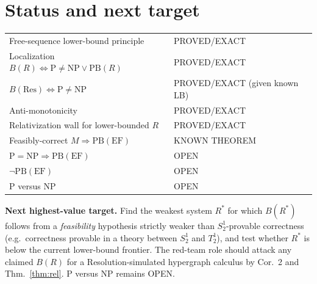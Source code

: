 \documentclass[11pt]{article}
\theoremstyle{definition}
\theoremstyle{remark}
\newcommand{\PB}{\mathrm{PB}}
\begin{document}
\section{Status and next target}
\begin{tabular}{ll}
Free-sequence lower-bound principle & PROVED/EXACT\\
Localization $B(R)\iff \mathrm P\ne\mathrm{NP}\vee\PB(R)$ & PROVED/EXACT\\
$B(\mathrm{Res})\iff\mathrm P\ne\mathrm{NP}$ & PROVED/EXACT (given known LB)\\
Anti-monotonicity & PROVED/EXACT\\
Relativization wall for lower-bounded $R$ & PROVED/EXACT\\
Feasibly-correct $M\Rightarrow\PB(\mathrm{EF})$ & KNOWN THEOREM\\
$\mathrm P=\mathrm{NP}\Rightarrow\PB(\mathrm{EF})$ & OPEN\\
$\neg\PB(\mathrm{EF})$ & OPEN\\
P versus NP & OPEN
\end{tabular}

\medskip\noindent\textbf{Next highest-value target.} Find the weakest system $R^\ast$ for which $B(R^\ast)$ follows from a
\emph{feasibility} hypothesis strictly weaker than $S^1_2$-provable correctness (e.g.\ correctness provable in a theory
between $S^1_2$ and $T^1_2$), and test whether $R^\ast$ is below the current lower-bound frontier. The red-team role should
attack any claimed $B(R)$ for a Resolution-simulated hypergraph calculus by Cor.~2 and Thm.~\ref{thm:rel}.
P versus NP remains OPEN.
\end{document}
